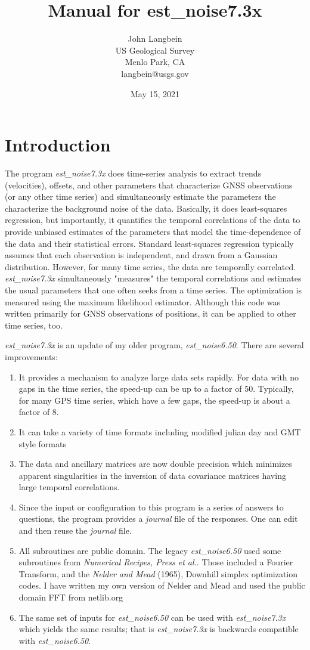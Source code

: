 \documentclass[12pt]{amsart}
\title{Manual for est\_noise7.3x}
\author{John Langbein \\
US Geological Survey \\
Menlo Park, CA \\
langbein@usgs.gov}
\date{May 15, 2021}                                          %
\begin{document}
\maketitle
\section{Introduction}

The program \textit{est\_noise7.3x} does time-series analysis to extract trends (velocities), offsets, and other
parameters that characterize GNSS observations (or any other time series) and simultaneously estimate the parameters the characterize the background noise
of the data. Basically, it does least-squares regression, but importantly, it quantifies the temporal correlations of the data to
provide unbiased estimates of the parameters that model the time-dependence of the data and their statistical errors. Standard least-squares regression typically assumes that each observation is independent, and drawn from a Gaussian distribution. However, for many time series, the data are temporally correlated.  \textit{est\_noise7.3x} simultaneously "measures" the temporal correlations and estimates the usual parameters that one often seeks from a time series.
The optimization is measured using the maximum likelihood estimator.  Although this code was written primarily for
GNSS observations of positions, it can be applied to other time series, too.

\textit{est\_noise7.3x} is an update of my older program, \textit{est\_noise6.50}.  There are several improvements:
\begin{enumerate}
\item {It provides a mechanism to analyze large data sets rapidly. For data with no gaps in the time series, the speed-up
can be up to a factor of 50. Typically, for many GPS time series, which have a few gaps, the speed-up is about a factor of 8.}
\item {It can take a variety of time formats including modified julian day and GMT style formats}
\item {The data and ancillary matrices are now double precision which minimizes apparent singularities in the inversion of data
covariance matrices having large temporal correlations.}
\item {Since the input or configuration to this program is a series of answers to questions, the program provides a
\textit{journal} file of the responses.  One can edit and then reuse the \textit{journal} file.}
\item {All subroutines are public domain. The legacy \textit{est\_noise6.50} used some subroutines from \textit{Numerical Recipes, Press et al.}. Those included a Fourier Transform, and the  \textit{Nelder and Mead} (1965), Downhill simplex optimization codes.
I have written my own version of Nelder and Mead and used the public domain FFT from netlib.org}
\item {The same set of inputs for \textit{est\_noise6.50} can be used with \textit{est\_noise7.3x} which yields the same
results; that is  \textit{est\_noise7.3x} is backwards compatible with  \textit{est\_noise6.50}.}
\end{enumerate}
\end{document}

